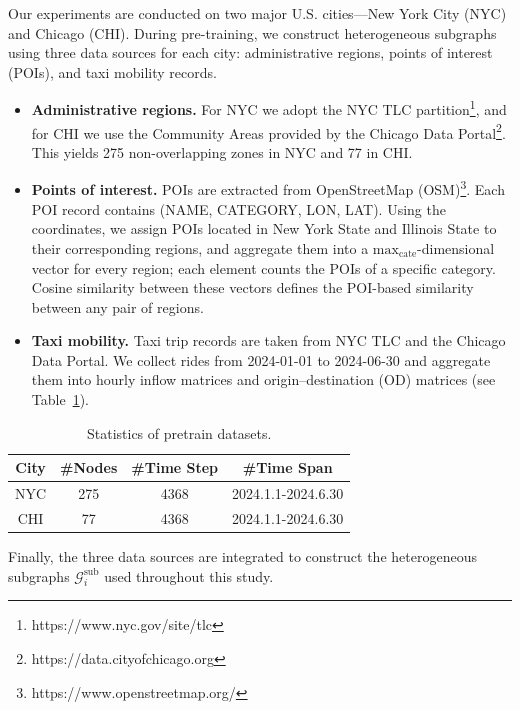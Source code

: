 Our experiments are conducted on two major U.S. cities—New York City (NYC) and Chicago (CHI).
During pre-training, we construct heterogeneous subgraphs using three data sources for each city: administrative regions, points of interest (POIs), and taxi mobility records.
\begin{itemize}
    \item \textbf{Administrative regions.} For NYC we adopt the NYC TLC partition\footnote{https://www.nyc.gov/site/tlc\label{fn:tlc}}, and for CHI we use the Community Areas provided by the Chicago Data Portal\footnote{https://data.cityofchicago.org\label{fn:CDP}}. This yields 275 non-overlapping zones in NYC and 77 in CHI.
    \item \textbf{Points of interest.} POIs are extracted from OpenStreetMap (OSM)\footnote{https://www.openstreetmap.org/}. Each POI record contains (NAME, CATEGORY, LON, LAT). Using the coordinates, we assign POIs located in New York State and Illinois State to their corresponding regions, and aggregate them into a $\text{max}_{\text{cate}}$-dimensional vector for every region; each element counts the POIs of a specific category. Cosine similarity between these vectors defines the POI-based similarity between any pair of regions.
    \item \textbf{Taxi mobility.} Taxi trip records are taken from NYC TLC and the Chicago Data Portal. We collect rides from 2024-01-01 to 2024-06-30 and aggregate them into hourly inflow matrices and origin–destination (OD) matrices (see Table~\ref{tab:data_statistics}).
\end{itemize}
\begin{table}[!htbp]
\centering
    {
        \begin{tabular}{c|ccc}
        \hline
        City     & \#Nodes & \#Time Step    & \#Time Span\\ \hline
        NYC      & 275   & 4368  & 2024.1.1-2024.6.30   \\
        CHI      & 77    & 4368  & 2024.1.1-2024.6.30   \\
        \hline
        \end{tabular}
    }
    \caption{Statistics of pretrain datasets.}
    \label{tab:data_statistics}
\end{table}
Finally, the three data sources are integrated to construct the heterogeneous subgraphs $\mathcal{G}_i^{\text{sub}}$ used throughout this study.

